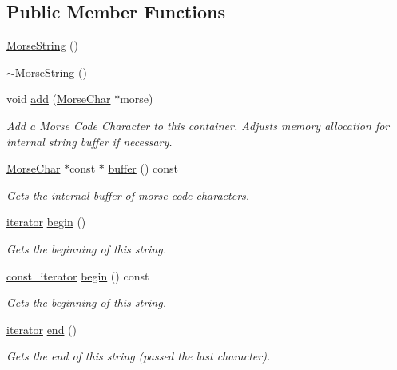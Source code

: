 \subsection*{Public Member Functions}
\begin{DoxyCompactItemize}
\item 
\hyperlink{class_morse_string_a58fd768c4206dbad63335a88ad9a8835}{Morse\-String} ()
\item 
\hyperlink{class_morse_string_a9ca5e741842ff4661dd39682f55e2174}{$\sim$\-Morse\-String} ()
\item 
void \hyperlink{class_morse_string_af597ac5411821fc471f6149d4a927572}{add} (\hyperlink{class_morse_char}{Morse\-Char} $\ast$morse)
\begin{DoxyCompactList}\small\item\em Add a Morse Code Character to this container. Adjusts memory allocation for internal string buffer if necessary. \end{DoxyCompactList}\item 
\hyperlink{class_morse_char}{Morse\-Char} $\ast$const $\ast$ \hyperlink{class_morse_string_a3cb4e2bce884cd3f86dba55692a80952}{buffer} () const 
\begin{DoxyCompactList}\small\item\em Gets the internal buffer of morse code characters. \end{DoxyCompactList}\item 
\hyperlink{class_morse_string_aed59863122221676213d8467a2774601}{iterator} \hyperlink{class_morse_string_a6ec233c4b9ed7f933e3d0db65662d250}{begin} ()
\begin{DoxyCompactList}\small\item\em Gets the beginning of this string. \end{DoxyCompactList}\item 
\hyperlink{class_morse_string_a8187161e4517b8721bdb562d90200cfd}{const\-\_\-iterator} \hyperlink{class_morse_string_a7f7ef3a8de9fa1a3e422da39f350caa3}{begin} () const 
\begin{DoxyCompactList}\small\item\em Gets the beginning of this string. \end{DoxyCompactList}\item 
\hyperlink{class_morse_string_aed59863122221676213d8467a2774601}{iterator} \hyperlink{class_morse_string_aca140f1865de7913bed748748b2365c7}{end} ()
\begin{DoxyCompactList}\small\item\em Gets the end of this string (passed the last character). \end{DoxyCompactList}\item 

\end{DoxyCompactItemize}
